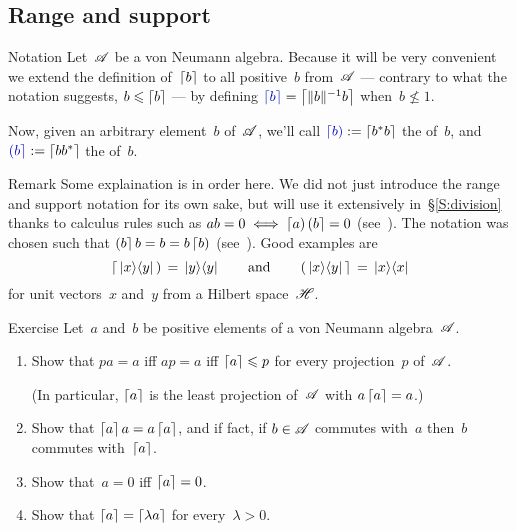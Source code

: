 \documentclass[a]{subfiles}
\begin{document}
\subsection{Range and support}
\begin{parsec}%
\begin{point}{Notation}%
Let~$\mathscr{A}$ be a von Neumann algebra.
Because it will be very convenient
we extend the definition of~$\left\lceil b\right\rceil$
to all positive~$b$ from~$\mathscr{A}$
---
contrary to what the notation suggests,
$b\leqslant \left\lceil b\right\rceil$
---
by 
defining $\Define{\ceil{b}}=\ceil{\|b\|^{-1} b}$
when~$b\nleq 1$.

Now, given an arbitrary element~$b$ of~$\mathscr{A}$,
we'll call $\Define{\ceill{b}}:=\ceil{b^*b}$
the  of~$b$,
and~$\Define{\ceilr{b}}:=\ceil{bb^*}$ the  of~$b$.
\end{point}
\begin{point}{Remark}%
Some explaination is in order here.
We did not just introduce
the range
and support notation for its own sake,
but will use it extensively in~\S\ref{S:division}
thanks to calculus rules
such as $ab=0\iff \left\lceil a\right)\left(b\right\rceil=0$
(see~).
The notation was chosen such 
that $\left(b\right\rceil b=b= b\left\lceil b\right)$
(see~).
Good examples are 
\begin{equation*}
	\left\lceil\,\left|x\right>\!\left<y\right|\,\right)
\,= \,\left|y\right>\!\left<y\right|
\qquad\text{and}\qquad
\left(\,\left|x\right>\!\left<y\right|\,\right\rceil
\,=\, \left|x\right>\!\left<x\right|
\end{equation*}
for unit vectors~$x$ and~$y$ from a Hilbert space~$\mathscr{H}$.
\end{point}
\begin{point}{Exercise}%
Let~$a$ and~$b$ be positive elements of a von Neumann algebra~$\mathscr{A}$.
\begin{enumerate}
\item
Show that $pa=a$ iff $ap=a$ iff $\left\lceil a\right\rceil\leqslant p$
for every projection~$p$ of~$\mathscr{A}$.

(In particular, $\left\lceil a\right\rceil$ is the least projection of~$\mathscr{A}$
with $a\left\lceil a\right\rceil=a$.)

\item
Show that $\left\lceil a\right\rceil a=a\left\lceil a\right\rceil$,
and if fact, if $b\in\mathscr{A}$ commutes with~$a$
then~$b$ commutes with~$\left\lceil a\right\rceil$.

\item
Show that~$a=0$ iff $\left\lceil a\right\rceil=0$.

\item
Show that $\left\lceil a\right\rceil=\left\lceil\lambda a\right\rceil$
for every~$\lambda>0$.


\end{enumerate}
\end{point}
\end{parsec}
\end{document}
